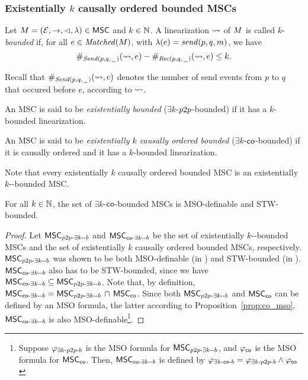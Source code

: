 \documentclass{article}
\begin{document}
\subsubsection{Existentially \texorpdfstring{$k$}{k} causally ordered bounded MSCs} 

\begin{definition}
Let $M = (\mathcal{E},\to,\lhd,\lambda) \in \mathsf{MSC}$ and $k \in \mathbb{N}$.
A linearization $\rightsquigarrow$ of $M$ is called
$k$-\emph{bounded} if, for all $e \in \mathit{Matched}(M)$, with $\lambda(e) = \mathit{send}(p, q, m)$, we have 
\[
\#_{{\mathit{Send}(p,q,\hspace{0.1em}\underline{\hspace{0.5em}}\hspace{0.1em})}}(\rightsquigarrow,e) - \#_{{\mathit{Rec}(p,q,\hspace{0.1em}\underline{\hspace{0.5em}}\hspace{0.1em})}}(\rightsquigarrow,e) \le k.
\]
\end{definition}
\noindent Recall that $\#_{{\mathit{Send}(p,q,\hspace{0.1em}\underline{\hspace{0.5em}}\hspace{0.1em})}}(\rightsquigarrow,e)$ denotes the number of send events from $p$ to $q$ that occured before $e$, according to $\rightsquigarrow$.

\begin{definition}\label{def:ex_k_pp_bounded}
	An MSC is said to be \emph{existentially \pp bounded} ($\exists k$-$p2p$-bounded) if it has a $k$-bounded linearization.
\end{definition}

\begin{definition}\label{def:ex_k_co_bounded}
An MSC is said to be \emph{existentially $k$ causally ordered bounded} ($\exists k$-$\mathsf{co}$-bounded) if it is causally ordered and it has a $k$-bounded linearization.
\end{definition}

Note that every existentially $k$ causally ordered bounded MSC is an existentially $k$-\pp-bounded MSC.

\begin{proposition}\label{prop:ek-co-bounded-mso-stw}
For all $k \in \mathbb{N}$, the set of $\exists k$-$\mathsf{co}$-bounded MSCs is MSO-definable and STW-bounded.
\end{proposition}
\begin{proof}
Let $\mathsf{MSC}_{p2p\text{-}\exists k\text{-}\text{-}b}$ and $\mathsf{MSC}_{\mathsf{co}\text{-}\exists k\text{-}\text{-}b}$ be the set of existentially $k$-\pp-bounded MSCs and the set of existentially $k$ causally ordered bounded MSCs, respectively. $\mathsf{MSC}_{p2p\text{-}\exists k\text{-}\text{-}b}$ was shown to be both MSO-definable (in \cite{DBLP:journals/iandc/LohreyM04}) and STW-bounded (in \cite[Proposition 5.4, page 163]{DBLP:journals/corr/abs-1904-06942}). $\mathsf{MSC}_{\mathsf{co}\text{-}\exists k\text{-}\text{-}b}$ also has to be STW-bounded, since we have $\mathsf{MSC}_{\mathsf{co}\text{-}\exists k\text{-}\text{-}b} \subseteq \mathsf{MSC}_{p2p\text{-}\exists k\text{-}\text{-}b}$. Note that, by definition, $\mathsf{MSC}_{\mathsf{co}\text{-}\exists k\text{-}\text{-}b} = \mathsf{MSC}_{p2p\text{-}\exists k\text{-}\text{-}b}\, \cap\, \mathsf{MSC}_{\mathsf{co}}$. Since both $\mathsf{MSC}_{p2p\text{-}\exists k\text{-}\text{-}b}$ and $\mathsf{MSC}_{\mathsf{co}}$ can be defined by an MSO formula, the latter according to Proposition~\ref{prop:co_mso}, $\mathsf{MSC}_{\mathsf{co}\text{-}\exists k\text{-}\text{-}b}$ is also MSO-definable\footnote{Suppose $\varphi_{\exists k\text{-}p2p\text{-}b}$ is the MSO formula for $\mathsf{MSC}_{p2p\text{-}\exists k\text{-}\text{-}b}$, and $\varphi_{\mathsf{co}}$ is the MSO formula for $\mathsf{MSC}_{\mathsf{co}}$. Then, $\mathsf{MSC}_{\mathsf{co}\text{-}\exists k\text{-}\text{-}b}$ is defined by $\varphi_{\exists k\text{-}\mathsf{co}\text{-}b} = \varphi_{\exists k\text{-}p2p\text{-}b} \wedge \varphi_{\mathsf{co}}$}.
\end{proof}
\end{document}

